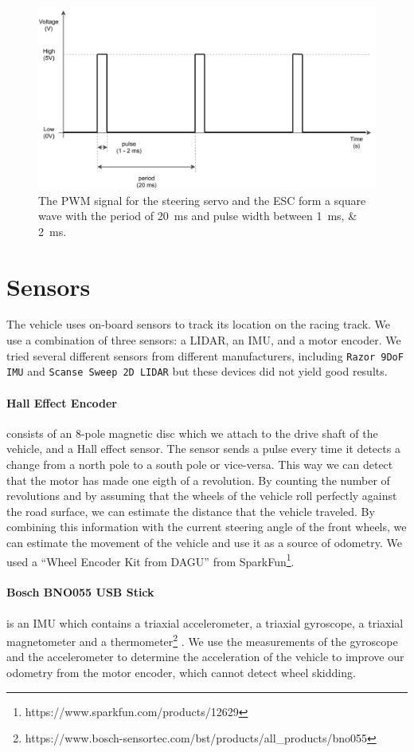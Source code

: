 \begin{figure}[]\centering
	\includegraphics[width=125mm]{../img/pwm.pdf}
	\caption{The PWM signal for the steering servo and the ESC form a square wave with the period of \SI{20}{\milli\second} and pulse width between \SIlist{1;2}{\milli\second}.}
	\label{fig:pwm}
\end{figure}
\section{Sensors}

The vehicle uses on-board sensors to track its location on the racing track. We use a combination of three sensors: a \gls{LIDAR}, an \gls{IMU}, and a motor encoder. We tried several different sensors from different manufacturers, including \verb|Razor 9DoF IMU| and \verb|Scanse Sweep 2D LIDAR| but these devices did not yield good results. 

\paragraph{Hall Effect Encoder} consists of an 8-pole magnetic disc which we attach to the drive shaft of the vehicle, and a Hall effect sensor. The sensor sends a pulse every time it detects a change from a north pole to a south pole or vice-versa. This way we can detect that the motor has made one eigth of a revolution. By counting the number of revolutions and by assuming that the wheels of the vehicle roll perfectly against the road surface, we can estimate the distance that the vehicle traveled. By combining this information with the current steering angle of the front wheels, we can estimate the movement of the vehicle and use it as a source of odometry. We used a ``Wheel Encoder Kit from DAGU'' from SparkFun\footnote{https://www.sparkfun.com/products/12629}.

\paragraph{Bosch BNO055 USB Stick} is an \gls{IMU} which contains a triaxial accelerometer, a triaxial gyroscope, a triaxial magnetometer and a thermometer\footnote{https://www.bosch-sensortec.com/bst/products/all\_products/bno055} . We use the measurements of the gyroscope and the accelerometer to determine the acceleration of the vehicle to improve our odometry from the motor encoder, which cannot detect wheel skidding.

